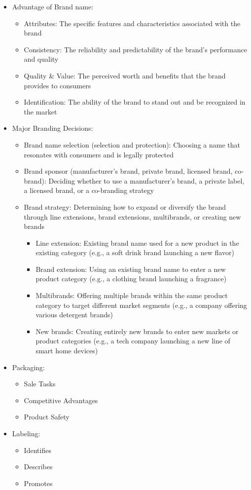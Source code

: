 \documentclass[openany,12pt,a4paper]{book}
\begin{document}
\begin{itemize}
    \item Advantage of Brand name:
    \begin{itemize}
        \item Attributes: The specific features and characteristics associated with the brand
        \item Consistency: The reliability and predictability of the brand's performance and quality
        \item Quality \& Value: The perceived worth and benefits that the brand provides to consumers
        \item Identification: The ability of the brand to stand out and be recognized in the market
    \end{itemize}
    \item Major Branding Decisions:
    \begin{itemize}
        \item Brand name selection (selection and protection): Choosing a name that resonates with consumers and is legally protected
        \item Brand sponsor (manufacturer's brand, private brand, licensed brand, co-brand): Deciding whether to use a manufacturer's brand, a private label, a licensed brand, or a co-branding strategy
        \item Brand strategy: Determining how to expand or diversify the brand through line extensions, brand extensions, multibrands, or creating new brands
        \begin{itemize}
            \item Line extension: Existing brand name used for a new product in the existing category (e.g., a soft drink brand launching a new flavor)
            \item Brand extension: Using an existing brand name to enter a new product category (e.g., a clothing brand launching a fragrance)
            \item Multibrands: Offering multiple brands within the same product category to target different market segments (e.g., a company offering various detergent brands)
            \item New brands: Creating entirely new brands to enter new markets or product categories (e.g., a tech company launching a new line of smart home devices)
        \end{itemize}
    \end{itemize}
    \item Packaging:
    \begin{itemize}
        \item Sale Tasks
        \item Competitive Advantages
        \item Product Safety
    \end{itemize}
    \item Labeling:
    \begin{itemize}
        \item Identifies
        \item Describes
        \item Promotes
    \end{itemize}


\end{itemize}
\end{document}
